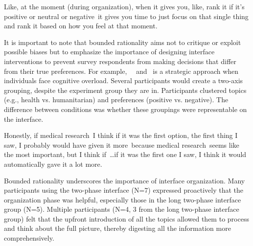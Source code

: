 \begin{displayquote}
Like, at the moment (during organization), when it gives you, like, rank it if it's positive or neutral or negative~\bracketellipsis it gives you time to just focus on that single thing and rank it based on how you feel at that moment. \hfill{}
\end{displayquote}

It is important to note that bounded rationality aims not to critique or exploit possible biases but to emphasize the importance of designing interface interventions to prevent survey respondents from making decisions that differ from their true preferences. For example,~\underline{}~\cite{simonSciencesArtificial1996} and~\underline{} is a strategic approach when individuals face cognitive overload. Several participants would create a two-axis grouping, despite the experiment group they are in. Participants clustered topics (e.g., health vs. humanitarian) and preferences (positive vs. negative). The difference between conditions was whether these groupings were representable on the interface.

\begin{displayquote}
    Honestly, if medical research~\bracketellipsis I think if it was the first option, the first thing I saw, I probably would have given it more~\bracketellipsis because medical research~\bracketellipsis seems like the most important, but I think if~\ldots if it was the first one I saw, I think it would automatically gave it a lot more. \hfill{}
\end{displayquote}

    

Bounded rationality underscores the importance of interface organization. Many participants using the two-phase interface (N=7) expressed proactively that the organization phase was helpful, especially those in the long two-phase interface group (N=5). Multiple participants (N=4, 3 from the long two-phase interface group) felt that the upfront introduction of all the topics allowed them to process and think about the full picture, thereby digesting all the information more comprehensively. 

